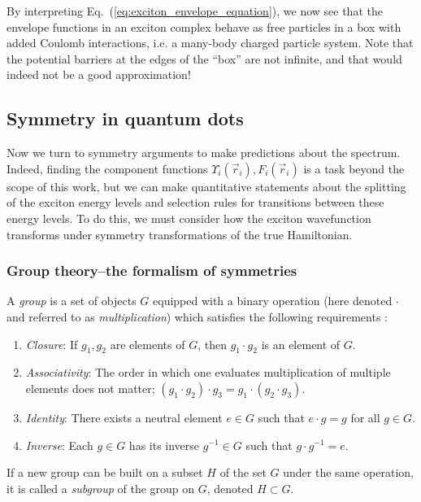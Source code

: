  By interpreting Eq.~(\ref{eq:exciton_envelope_equation}), we now see that the envelope functions in an exciton complex behave as free particles in a box with added Coulomb interactions, i.e. a many-body charged particle system. Note that the potential barriers at the edges of the ``box'' are not infinite, and that would indeed not be a good approximation!

\subsection{Symmetry in quantum dots} \label{sec:symmetry_arguments}
Now we turn to symmetry arguments to make predictions about the spectrum. Indeed, finding the component functions $\Upsilon_i\left(\vec{r}_i\right), F_i\left(\vec{r}_i\right)$ is a task beyond the scope of this work, but we can make quantitative statements about the splitting of the exciton energy levels and selection rules for transitions between these energy levels. To do this, we must consider how the exciton wavefunction transforms under symmetry transformations of the true Hamiltonian.

\subsubsection{Group theory--the formalism of symmetries} \label{sec:group_theory_intro}
A \textit{group} is a set of objects $G$ equipped with a binary operation (here denoted $\cdot$ and referred to as \textit{multiplication}) which satisfies the following requirements \cite[Ch.~1]{dresselhaus}:
\begin{enumerate}
\item \textit{Closure}: If $g_1, g_2$ are elements of $G$, then $g_1\cdot g_2$ is an element of $G$.
\item \textit{Associativity}: The order in which one evaluates multiplication of multiple elements does not matter; $(g_1\cdot g_2) \cdot g_3 = g_1 \cdot (g_2 \cdot g_3)$.
\item \textit{Identity}: There exists a neutral element $e\in G$ such that $e \cdot g = g$ for all $g\in G$.
\item \textit{Inverse}: Each $g\in G$ has its inverse $g^{-1}\in G$ such that $g \cdot g^{-1} = e$.
\end{enumerate}
If a new group can be built on a subset $H$ of the set $G$ under the same operation, it is called a \textit{subgroup} of the group on $G$, denoted $H\subset G$.

